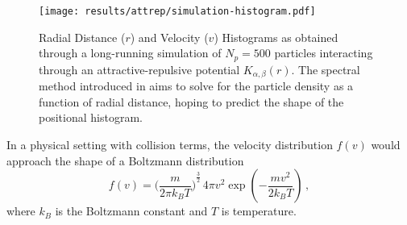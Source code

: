 \begin{figure}[H]
  \centering
  \label{fig:simulation-histogram}
  \texttt{[image: results/attrep/simulation-histogram.pdf]}
  \caption[Radial Distance and Velocity Histograms of attractive-repulsive Simulation Output in 1D]{Radial Distance ($r$) and Velocity ($v$) Histograms as obtained through a long-running simulation of $N_p = 500$ particles interacting through an attractive-repulsive potential $K_{\alpha, \beta}(r)$. The spectral method introduced in  aims to solve for the particle density as a function of radial distance, hoping to predict the shape of the positional histogram.}
\end{figure}

In a physical setting with collision terms, the velocity distribution $f(v)$ would approach the shape of a Boltzmann distribution
$$f(v)={\bigg(\frac{m}{2\pi k_B T}\bigg)}^{\frac {3}{2}}\,4\pi v^{2}\exp \left(-{\frac {mv^{2}}{2k_B T}}\right)\,,$$
where $k_B$ is the Boltzmann constant and $T$ is temperature.
